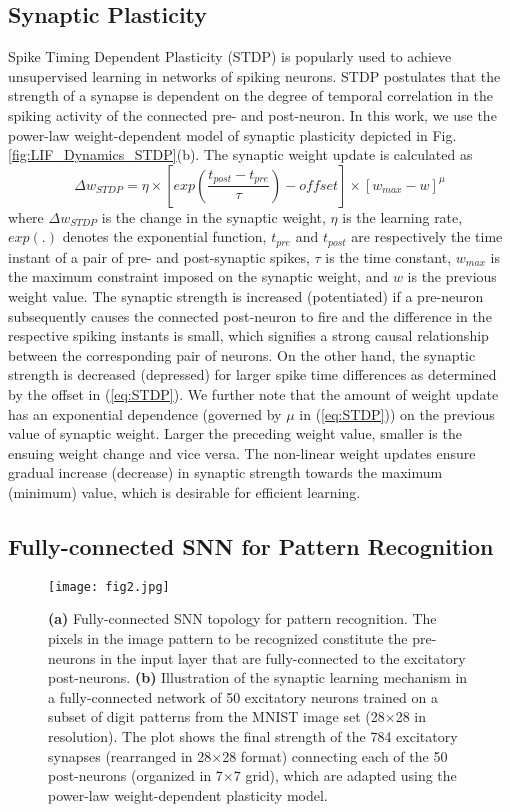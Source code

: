 \documentclass[journal, onecolumn]{IEEEtran}
\begin{document}
\subsection*{\normalsize\bf{Synaptic Plasticity}}
Spike Timing Dependent Plasticity (STDP) is popularly used to achieve unsupervised learning in networks of spiking neurons. STDP postulates that the strength of a synapse is dependent on the degree of temporal correlation in the spiking activity of the connected pre- and post-neuron. In this work, we use the power-law weight-dependent model \cite{diehl2015unsupervised} of synaptic plasticity depicted in Fig. \ref{fig:LIF_Dynamics_STDP}(b). The synaptic weight update is calculated as
\begin{equation} \label{eq:STDP}
\Delta w_{STDP} = \eta \times [exp(\frac{t_{post}-t_{pre}}{\tau}) - offset] \times [w_{max} - w]^\mu
\end{equation}
where $\Delta w_{STDP}$ is the change in the synaptic weight, $\eta$ is the learning rate, $exp(.)$ denotes the exponential function, $t_{pre}$ and $t_{post}$ are respectively the time instant of a pair of pre- and post-synaptic spikes, $\tau$ is the time constant, $w_{max}$ is the maximum constraint imposed on the synaptic weight, and $w$ is the previous weight value. The synaptic strength is increased (potentiated) if a pre-neuron subsequently causes the connected post-neuron to fire and the difference in the respective spiking instants is small, which signifies a strong causal relationship between the corresponding pair of neurons. On the other hand, the synaptic strength is decreased (depressed) for larger spike time differences as determined by the offset in (\ref{eq:STDP}). We further note that the amount of weight update has an exponential dependence (governed by $\mu$ in (\ref{eq:STDP})) on the previous value of synaptic weight. Larger the preceding weight value, smaller is the ensuing weight change and vice versa. The non-linear weight updates ensure gradual increase (decrease) in synaptic strength towards the maximum (minimum) value, which is desirable for efficient learning.

\subsection*{\normalsize\bf{Fully-connected SNN for Pattern Recognition}}
\begin{figure}[!t]
\centering
\texttt{[image: fig2.jpg]}
\caption{\textbf{(a)} Fully-connected SNN topology for pattern recognition. The pixels in the image pattern to be recognized constitute the pre-neurons in the input layer that are fully-connected to the excitatory post-neurons. \textbf{(b)} Illustration of the synaptic learning mechanism in a fully-connected network of 50 excitatory neurons trained on a subset of digit patterns from the MNIST image set (28$\times$28 in resolution). The plot shows the final strength of the 784 excitatory synapses (rearranged in 28$\times$28 format) connecting each of the 50 post-neurons (organized in 7$\times$7 grid), which are adapted using the power-law weight-dependent plasticity model.}
\label{fig:FSNN}
\end{figure}
\end{document}
